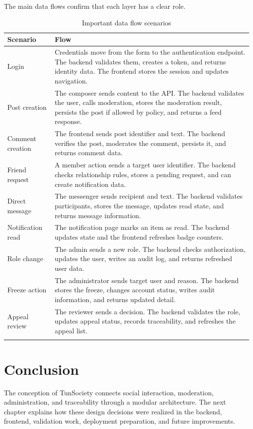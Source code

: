 The main data flows confirm that each layer has a clear role.

\begin{longtable}{|m{3.2cm}|m{10.5cm}|}
\hline
\textbf{Scenario} & \textbf{Flow} \\
\hline
Login & Credentials move from the form to the authentication endpoint. The backend validates them, creates a token, and returns identity data. The frontend stores the session and updates navigation. \\
\hline
Post creation & The composer sends content to the API. The backend validates the user, calls moderation, stores the moderation result, persists the post if allowed by policy, and returns a feed response. \\
\hline
Comment creation & The frontend sends post identifier and text. The backend verifies the post, moderates the comment, persists it, and returns comment data. \\
\hline
Friend request & A member action sends a target user identifier. The backend checks relationship rules, stores a pending request, and can create notification data. \\
\hline
Direct message & The messenger sends recipient and text. The backend validates participants, stores the message, updates read state, and returns message information. \\
\hline
Notification read & The notification page marks an item as read. The backend updates state and the frontend refreshes badge counters. \\
\hline
Role change & The admin sends a new role. The backend checks authorization, updates the user, writes an audit log, and returns refreshed user data. \\
\hline
Freeze action & The administrator sends target user and reason. The backend stores the freeze, changes account status, writes audit information, and returns updated detail. \\
\hline
Appeal review & The reviewer sends a decision. The backend validates the role, updates appeal status, records traceability, and refreshes the appeal list. \\
\hline
\caption{Important data flow scenarios}
\end{longtable}

\section{Conclusion}

The conception of TunSociety connects social interaction, moderation, administration, and traceability through a modular architecture. The next chapter explains how these design decisions were realized in the backend, frontend, validation work, deployment preparation, and future improvements.
